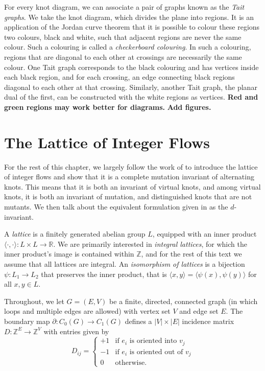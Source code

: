 \documentclass[12pt]{report}
\newcommand{\R}{\mathbb{R}}
\newcommand{\Z}{\mathbb{Z}}
\newcommand{\ip}[2]{\langle #1, #2 \rangle}
\newcommand{\notered}[1]{{\color{Red} \textbf{#1}}}
\newcommand{\notegreen}[1]{{\color{Green} \textbf{#1}}}
\begin{document}
For every knot diagram, we can associate a pair of graphs known as the \textit{Tait graphs}. We take the knot diagram, which divides the plane into regions. It is an application of the Jordan curve theorem that it is possible to colour these regions two colours, black and white, such that adjacent regions are never the same colour. Such a colouring is called a \textit{checkerboard colouring}. In such a colouring, regions that are diagonal to each other at crossings are necessarily the same colour. One Tait graph corresponds to the black colouring and has vertices inside each black region, and for each crossing, an edge connecting black regions diagonal to each other at that crossing. Similarly, another Tait graph, the planar dual of the first, can be constructed with the white regions as vertices. \notegreen{Red and green regions may work better for diagrams.} \notered{Add figures.}


\section{The Lattice of Integer Flows}

For the rest of this chapter, we largely follow the work of \cite{lattices-graphs-mutation} to introduce the lattice of integer flows and show that it is a complete mutation invariant of alternating knots. This means that it is both an invariant of virtual knots, and among virtual knots, it is both an invariant of mutation, and distinguished knots that are not mutants. We then talk about the equivalent formulation given in \cite{lattices-graphs-mutation} as the $d$-invariant.

A \textit{lattice} is a finitely generated abelian group $L$, equipped with an inner product 
\({\ip{\cdot}{\cdot}: L \times L \longrightarrow \R}\). We are primarily interested in \textit{integral lattices}, for which the inner product's image is contained within $\Z$, and for the rest of this text we assume that all lattices are integral. An \textit{isomorphism of lattices} is a bijection $\psi: L_{1} \longrightarrow L_{2}$ that preserves the inner product, that is ${\ip{x}{y} = \ip{\psi(x)}{\psi(y)}}$ for all $x, y \in L$.

Throughout, we let $G = (E, V)$ be a finite, directed, connected graph (in which loops and multiple edges are allowed) with vertex set $V$ and edge set $E$. The boundary map $\partial:  C_{0}(G) \longrightarrow C_{1}(G)$ defines a $|V|\times|E|$ incidence matrix $D : \Z^{E} \longrightarrow \Z^{V}$ with entries given by
\[D_{ij} = \begin{cases}
	+1 & \text{if $e_{i}$ is oriented into $v_{j}$}   \\
	-1 & \text{if $e_{i}$ is oriented out of $v_{j}$} \\
	0  & \text{otherwise.}
\end{cases}\]
\end{document}

